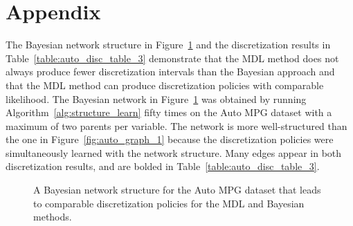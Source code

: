 





\section*{Appendix}
\label{sec:appendix}

The Bayesian network structure in Figure~\ref{fig:auto_graph_3} and the discretization results in Table~\ref{table:auto_disc_table_3} demonstrate that the MDL method does not always produce fewer discretization intervals than the Bayesian approach and that the MDL method can produce discretization policies with comparable likelihood.
The Bayesian network in Figure~\ref{fig:auto_graph_3} was obtained by running Algorithm~\ref{alg:structure_learn} fifty times on the Auto MPG dataset with a maximum of two parents per variable.
The network is more well-structured than the one in Figure~\ref{fig:auto_graph_1} because the discretization policies were simultaneously learned with the network structure.
Many edges appear in both discretization results, and are bolded in Table~\ref{table:auto_disc_table_3}.

\begin{figure}[ht]
  \centering
  \scalebox{0.8}{}
  \caption{A Bayesian network structure for the Auto MPG dataset that leads to comparable discretization policies for the MDL and Bayesian methods.}
  \label{fig:auto_graph_3}
\end{figure}

\begin{table}[ht]
  \centering
  \caption{
    The discretization policies for the Auto MPG dataset with the fixed structure shown in Figure~\ref{fig:auto_graph_3}.
    The methods have the same discretization for variable $A$, and the log-likelihood for the Bayesian method is only slightly better than that for the MDL method.
  }

  \label{table:auto_disc_table_3}
\end{table}


